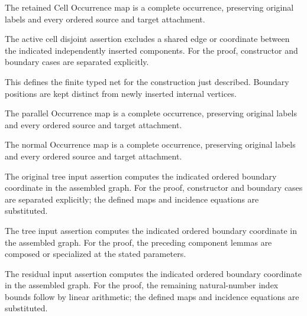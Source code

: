 The retained Cell Occurrence map is a complete occurrence, preserving original labels and every ordered source and target attachment.
\par{}

The active cell disjoint assertion excludes a shared edge or coordinate between the indicated independently inserted components.
For the proof, constructor and boundary cases are separated explicitly.
\par{}

This defines the finite typed net for the construction just described. Boundary positions are kept distinct from newly inserted internal vertices.
\par{}

The parallel Occurrence map is a complete occurrence, preserving original labels and every ordered source and target attachment.
\par{}

The normal Occurrence map is a complete occurrence, preserving original labels and every ordered source and target attachment.
\par{}

The original tree input assertion computes the indicated ordered boundary coordinate in the assembled graph.
For the proof, constructor and boundary cases are separated explicitly; the defined maps and incidence equations are substituted.
\par{}

The tree input assertion computes the indicated ordered boundary coordinate in the assembled graph.
For the proof, the preceding component lemmas are composed or specialized at the stated parameters.
\par{}

The residual input assertion computes the indicated ordered boundary coordinate in the assembled graph.
For the proof, the remaining natural-number index bounds follow by linear arithmetic; the defined maps and incidence equations are substituted.
\par{}

